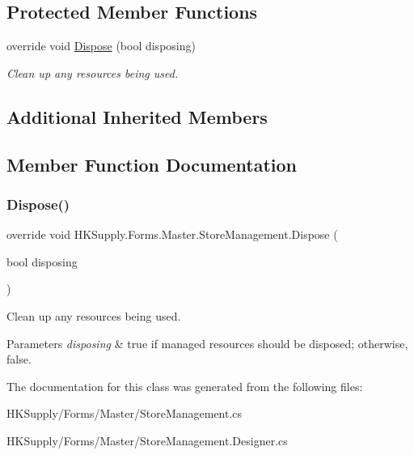 \subsection*{Protected Member Functions}
\begin{DoxyCompactItemize}
\item 
override void \mbox{\hyperlink{class_h_k_supply_1_1_forms_1_1_master_1_1_store_management_aaf2bcaa324f2ad626ac66c0d8afe78cb}{Dispose}} (bool disposing)
\begin{DoxyCompactList}\small\item\em Clean up any resources being used. \end{DoxyCompactList}\end{DoxyCompactItemize}
\subsection*{Additional Inherited Members}


\subsection{Member Function Documentation}
\mbox{\label{class_h_k_supply_1_1_forms_1_1_master_1_1_store_management_aaf2bcaa324f2ad626ac66c0d8afe78cb}} 
\subsubsection{\texorpdfstring{Dispose()}{Dispose()}}
{\footnotesize\ttfamily override void H\+K\+Supply.\+Forms.\+Master.\+Store\+Management.\+Dispose (\begin{DoxyParamCaption}\item[{bool}]{disposing }\end{DoxyParamCaption})\hspace{0.3cm}{\ttfamily [protected]}}



Clean up any resources being used. 


\begin{DoxyParams}{Parameters}
{\em disposing} & true if managed resources should be disposed; otherwise, false.\\
\hline
\end{DoxyParams}


The documentation for this class was generated from the following files\+:\begin{DoxyCompactItemize}
\item 
H\+K\+Supply/\+Forms/\+Master/Store\+Management.\+cs\item 
H\+K\+Supply/\+Forms/\+Master/Store\+Management.\+Designer.\+cs\end{DoxyCompactItemize}
